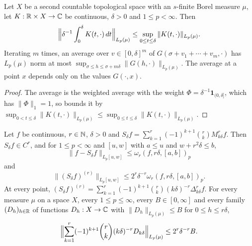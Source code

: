 \begin{lemma}
\label{lem:minkowski-avg}
\leanok
{}
Let $X$ be a second countable topological space with an $s$-finite Borel measure $\mu$, let
$K : \mathbb{R} \times X \to \mathbb{C}$ be continuous, $\delta > 0$ and $1 \leq p < \infty$. Then
\[
  \Bigl\| \delta^{-1} \int_0^\delta K(t, \cdot) \, dt \Bigr\|_{L_p(\mu)}
  \leq \sup_{0 \leq t \leq \delta} \|K(t, \cdot)\|_{L_p(\mu)} .
\]
Iterating $m$ times, an average over $v \in [0, \delta]^m$ of $G(\sigma + v_1 + \cdots + v_m, \cdot)$
has $L_p(\mu)$ norm at most $\sup_{\sigma \leq h \leq \sigma + m \delta} \|G(h, \cdot)\|_{L_p(\mu)}$.
The average at a point $x$ depends only on the values $G(\cdot, x)$.
\end{lemma}

\begin{proof}
\leanok
The average is the weighted average with the weight
$\Phi = \delta^{-1} \mathbf{1}_{(0, \delta]}$, which has $\|\Phi\|_1 = 1$, so
 bounds it by
$\sup_{0 < t \leq \delta} \|K(t, \cdot)\|_{L_p(\mu)} \leq
\sup_{0 \leq t \leq \delta} \|K(t, \cdot)\|_{L_p(\mu)}$.
\end{proof}

\begin{theorem}
\label{thm:steklov-smoothing}
\leanok
{}
Let $f$ be continuous, $r \in \mathbb{N}$, $\delta > 0$ and
$S_\delta f = \sum_{k=1}^r (-1)^{k+1} \binom{r}{k} M_{k\delta}^r f$. Then $S_\delta f \in C^r$, and for
$1 \leq p < \infty$ and $[u, w]$ with $a \leq u$ and $w + r^2 \delta \leq b$,
\[
  \|f - S_\delta f\|_{L_p[u, w]} \leq \omega_r(f, r\delta, [a, b])_p
\]
and
\[
  \|(S_\delta f)^{(r)}\|_{L_p[u, w]} \leq 2^r \delta^{-r} \omega_r(f, r\delta, [a, b])_p .
\]
At every point,
$(S_\delta f)^{(r)} = \sum_{k=1}^r (-1)^{k+1} \binom{r}{k} (k\delta)^{-r} \Delta_{k\delta}^r f$.
For every measure $\mu$ on a space $X$, every $1 \leq p \leq \infty$, every $B \in [0, \infty]$
and every family $(D_h)_{h \in \mathbb{R}}$ of functions $D_h : X \to \mathbb{C}$ with
$\|D_h\|_{L_p(\mu)} \leq B$ for $0 \leq h \leq r\delta$,
\[
  \Bigl\| \sum_{k=1}^r (-1)^{k+1} \binom{r}{k} (k\delta)^{-r} D_{k\delta} \Bigr\|_{L_p(\mu)}
  \leq 2^r \delta^{-r} B .
\]
\end{theorem}

